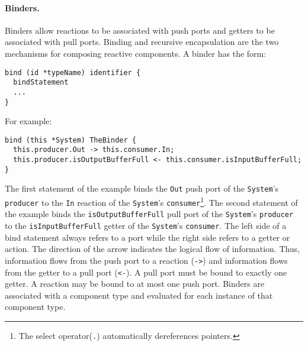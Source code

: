 \paragraph{Binders.}
Binders allow reactions to be associated with push ports and getters to be associated with pull ports.
Binding and recursive encapsulation are the two mechanisms for composing reactive components.
A binder has the form:
\begin{verbatim}
bind (id *typeName) identifier {
  bindStatement
  ...
}
\end{verbatim}
For example:
\begin{verbatim}
bind (this *System) TheBinder {
  this.producer.Out -> this.consumer.In;
  this.producer.isOutputBufferFull <- this.consumer.isInputBufferFull;
}
\end{verbatim}
The first statement of the example binds the \verb+Out+ push port of the \verb+System+'s \verb+producer+ to the \verb+In+ reaction of the \verb+System+'s \verb+consumer+\footnote{The select operator(\texttt{.}) automatically dereferences pointers.}.
The second statement of the example binds the \verb+isOutputBufferFull+ pull port of the \verb+System+'s \verb+producer+ to the \verb+isInputBufferFull+ getter of the \verb+System+'s \verb+consumer+.
The left side of a bind statement always refers to a port while the right side refers to a getter or action.
The direction of the arrow indicates the logical flow of information.
Thus, information flows from the push port to a reaction (\verb+->+) and information flows from the getter to a pull port (\verb+<-+).
A pull port must be bound to exactly one getter.
A reaction may be bound to at most one push port.
Binders are associated with a component type and evaluated for each instance of that component type.


